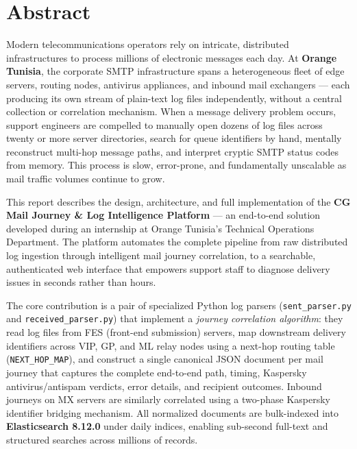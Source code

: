 \documentclass[12pt,a4paper,oneside]{report}
\begin{document}
\chapter*{Abstract}
{}

Modern telecommunications operators rely on intricate, distributed infrastructures to process millions of electronic messages each day.
At \textbf{Orange Tunisia}, the corporate SMTP infrastructure spans a heterogeneous fleet of edge servers, routing nodes, antivirus appliances, and inbound mail exchangers --- each producing its own stream of plain-text log files independently, without a central collection or correlation mechanism.
When a message delivery problem occurs, support engineers are compelled to manually open dozens of log files across twenty or more server directories, search for queue identifiers by hand, mentally reconstruct multi-hop message paths, and interpret cryptic SMTP status codes from memory.
This process is slow, error-prone, and fundamentally unscalable as mail traffic volumes continue to grow.

This report describes the design, architecture, and full implementation of the \textbf{CG Mail Journey \& Log Intelligence Platform} --- an end-to-end solution developed during an internship at Orange Tunisia's Technical Operations Department.
The platform automates the complete pipeline from raw distributed log ingestion through intelligent mail journey correlation, to a searchable, authenticated web interface that empowers support staff to diagnose delivery issues in seconds rather than hours.

The core contribution is a pair of specialized Python log parsers (\texttt{sent\_parser.py} and \texttt{received\_parser.py}) that implement a \emph{journey correlation algorithm}: they read log files from FES (front-end submission) servers, map downstream delivery identifiers across VIP, GP, and ML relay nodes using a next-hop routing table (\texttt{NEXT\_HOP\_MAP}), and construct a single canonical JSON document per mail journey that captures the complete end-to-end path, timing, Kaspersky antivirus/antispam verdicts, error details, and recipient outcomes.
Inbound journeys on MX servers are similarly correlated using a two-phase Kaspersky identifier bridging mechanism.
All normalized documents are bulk-indexed into \textbf{Elasticsearch 8.12.0} under daily indices, enabling sub-second full-text and structured searches across millions of records.
\end{document}
